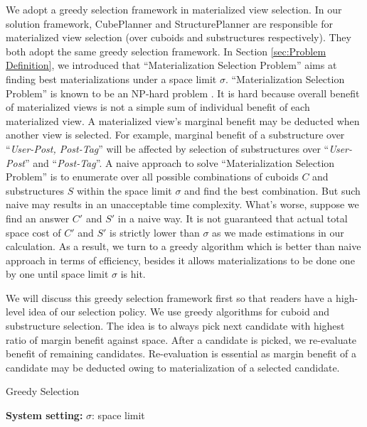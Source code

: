 We adopt a greedy selection framework in materialized view selection. In our solution framework, CubePlanner and StructurePlanner are responsible for materialized view selection (over cuboids and substructures respectively). They both adopt the same greedy selection framework. In Section \ref{sec:Problem Definition}, we introduced that ``Materialization Selection Problem'' aims at finding best materializations under a space limit $\sigma$. ``Materialization Selection Problem'' is known to be an NP-hard problem \cite{DBLP:journals/kais/LinK04}. It is hard because overall benefit of materialized views is not a simple sum of individual benefit of each materialized view. A materialized view's marginal benefit may be deducted when another view is selected. For example, marginal benefit of a substructure over ``\textit{User-Post, Post-Tag}'' will be affected by selection of substructures over ``\textit{User-Post}'' and ``\textit{Post-Tag}''. A naive approach to solve ``Materialization Selection Problem'' is to enumerate over all possible combinations of cuboids $C$ and substructures $S$ within the space limit $\sigma$ and find the best combination. But such naive may results in an unacceptable time complexity. What's worse, suppose we find an answer $C'$ and $S'$ in a naive way. It is not guaranteed that actual total space cost of $C'$ and $S'$ is strictly lower than $\sigma$ as we made estimations in our calculation. As a result, we turn to a greedy algorithm which is better than naive approach in terms of efficiency, besides it allows materializations to be done one by one until space limit $\sigma$ is hit.

We will discuss this greedy selection framework first so that readers have a high-level idea of our selection policy. We use greedy algorithms for cuboid and substructure selection. The idea is to always pick next candidate with highest ratio of margin benefit against space. After a candidate is picked, we re-evaluate benefit of remaining candidates. Re-evaluation is essential as margin benefit of a candidate may be deducted owing to materialization of a selected candidate. 


\begin{algorithm}[H]
	\caption{Greedy Selection}
	\LinesNumbered  
	\textbf{System setting:} $\sigma$: space limit\\ 
	
\end{algorithm}

